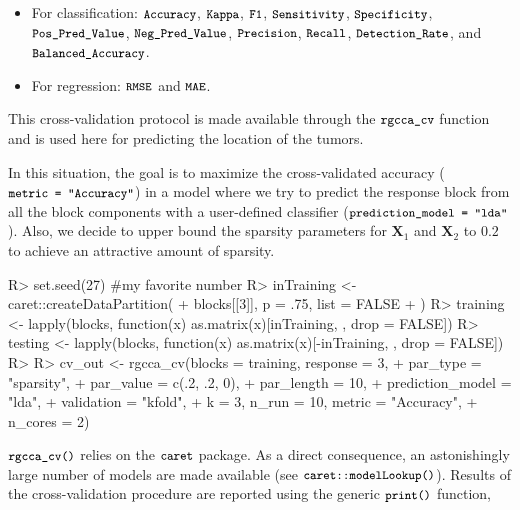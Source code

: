 \documentclass[
]{jss}
\begin{document}
\begin{itemize}
\item
  For classification: \(\small{\texttt{Accuracy}}\),
  \(\small{\texttt{Kappa}}\), \(\small{\texttt{F1}}\),
  \(\small{\texttt{Sensitivity}}\), \(\small{\texttt{Specificity}}\),
  \(\small{\texttt{Pos\_Pred\_Value}}\),
  \(\small{\texttt{Neg\_Pred\_Value}}\), \(\small{\texttt{Precision}}\),
  \(\small{\texttt{Recall}}\), \(\small{\texttt{Detection\_Rate}}\), and
  \(\small{\texttt{Balanced\_Accuracy}}\).
\item
  For regression: \(\small{\texttt{RMSE}}\) and
  \(\small{\texttt{MAE}}\).
\end{itemize}

This cross-validation protocol is made available through the
\(\small{\texttt{rgcca\_cv}}\) function and is used here for predicting
the location of the tumors.

In this situation, the goal is to maximize the cross-validated accuracy
(\(\small{\texttt{metric = "Accuracy"}}\)) in a model where we try to
predict the response block from all the block components with a
user-defined classifier
(\(\small{\texttt{prediction\_model = "lda"}}\)). Also, we decide to
upper bound the sparsity parameters for \(\mathbf X_1\) and
\(\mathbf X_2\) to \(0.2\) to achieve an attractive amount of sparsity.

\footnotesize

\begin{CodeChunk}
\begin{CodeInput}
R> set.seed(27) #my favorite number
R> inTraining <- caret::createDataPartition(
+   blocks[[3]], p = .75, list = FALSE
+ )
R> training <- lapply(blocks, function(x) as.matrix(x)[inTraining, , drop = FALSE])
R> testing <- lapply(blocks, function(x) as.matrix(x)[-inTraining, , drop = FALSE])
R> 
R> cv_out <- rgcca_cv(blocks = training, response = 3,
+                    par_type = "sparsity",
+                    par_value = c(.2, .2, 0),
+                    par_length = 10,
+                    prediction_model = "lda",
+                    validation = "kfold",
+                    k = 3, n_run = 10, metric = "Accuracy",
+                    n_cores = 2)
\end{CodeInput}
\end{CodeChunk}

\normalsize

\(\small{\texttt{rgcca\_cv()}}\) relies on the
\(\small{\texttt{caret}}\) package. As a direct consequence, an
astonishingly large number of models are made available (see
\(\small{\texttt{caret::modelLookup()}}\)). Results of the
cross-validation procedure are reported using the generic
\(\small{\texttt{print()}}\) function,
\end{document}
